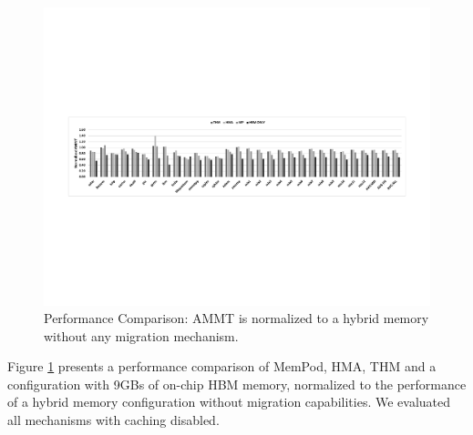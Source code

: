\begin{figure}[t]
  \includegraphics[width=\textwidth]{figures/performance_over_nlm.pdf}
  \caption{Performance Comparison: AMMT is normalized to a hybrid memory without any migration mechanism.}
  \label{fig:performance}
\end{figure}

Figure \ref{fig:performance} presents a performance comparison of MemPod, HMA, THM and a configuration with 9GBs of on-chip HBM memory, normalized to the performance of a hybrid memory configuration without migration capabilities. We evaluated all mechanisms with caching disabled. 

